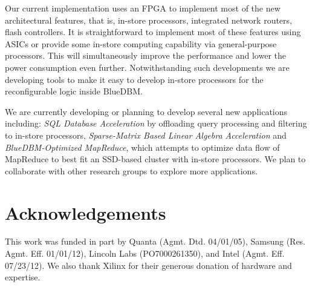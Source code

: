 \documentclass[pageno]{jpaper}
\begin{document}
Our current implementation uses an FPGA to implement most of the new
architectural features, that is, in-store processors, integrated network
routers, flash controllers. It is straightforward to implement most of these
features using ASICs or provide some in-store computing capability via
general-purpose processors. This will simultaneously improve the performance
and lower the power consumption even further. Notwithstanding such developments
we are developing tools to make it easy to develop in-store processors for the
reconfigurable logic inside BlueDBM.  



We are currently developing or planning to develop several new applications
including:  
\emph{SQL Database Acceleration} by offloading query processing and
filtering to in-store processors,
\emph{Sparse-Matrix Based Linear Algebra Acceleration} and
\emph{BlueDBM-Optimized MapReduce}, which attempts to optimize data
flow of MapReduce to best fit an SSD-based cluster with in-store processors.
We plan to collaborate with other research groups to explore more applications.

\section{Acknowledgements}
This work was funded in part by Quanta (Agmt. Dtd. 04/01/05), Samsung (Res.
Agmt. Eff. 01/01/12), Lincoln Labs (PO7000261350), and Intel (Agmt. Eff.
07/23/12). We also thank Xilinx for
their generous donation of hardware and expertise.

\vfill



\end{document}
